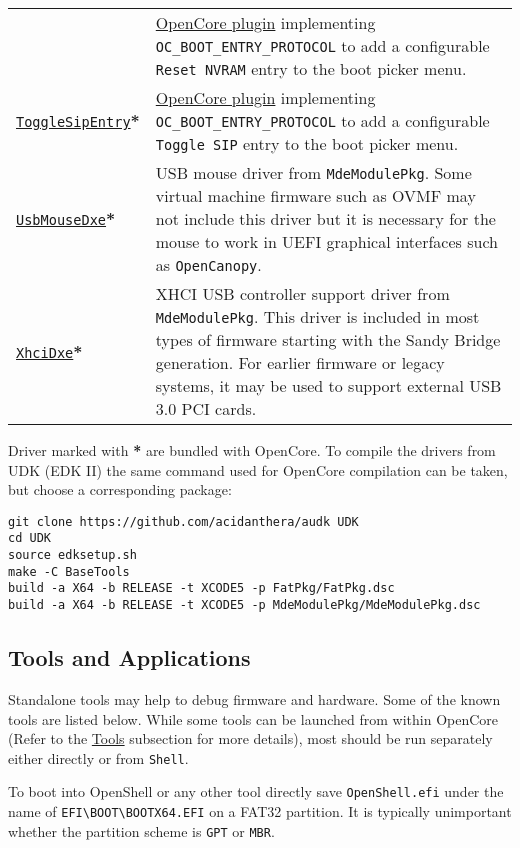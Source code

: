 \documentclass[]{article}
\makeatletter
\renewcommand{\label}[1]{%
\zref@wrapper@immediate{\oldlabel{#1}}}  %
\makeatother
\begin{document}
\begin{longtable}{p{1.65in}p{5.25in}}
& \hyperref[uefiresetnvram]{OpenCore plugin} implementing \texttt{OC\_BOOT\_ENTRY\_PROTOCOL}
  to add a configurable \texttt{Reset NVRAM} entry to the boot picker menu. \\
\href{https://github.com/acidanthera/OpenCorePkg}{\texttt{ToggleSipEntry}}\textbf{*}
& \hyperref[uefitogglesip]{OpenCore plugin} implementing \texttt{OC\_BOOT\_ENTRY\_PROTOCOL}
  to add a configurable \texttt{Toggle SIP} entry to the boot picker menu. \\
\href{https://github.com/acidanthera/audk}{\texttt{UsbMouseDxe}}\textbf{*}
& USB mouse driver from \texttt{MdeModulePkg}. Some virtual machine firmware
  such as OVMF may not include this driver but it is necessary for the mouse to work
  in UEFI graphical interfaces such as \texttt{OpenCanopy}. \\
\href{https://github.com/acidanthera/audk}{\texttt{XhciDxe}}\textbf{*}
& XHCI USB controller support driver from \texttt{MdeModulePkg}. This driver is
  included in most types of firmware starting with the Sandy Bridge generation. For earlier firmware
  or legacy systems, it may be used to support external USB 3.0 PCI cards.
\end{longtable}

Driver marked with \textbf{*} are bundled with OpenCore.
To compile the drivers from UDK (EDK II) the same command used for
OpenCore compilation can be taken, but choose a corresponding package:
\begin{lstlisting}[label=compileudk, style=ocbash]
git clone https://github.com/acidanthera/audk UDK
cd UDK
source edksetup.sh
make -C BaseTools
build -a X64 -b RELEASE -t XCODE5 -p FatPkg/FatPkg.dsc
build -a X64 -b RELEASE -t XCODE5 -p MdeModulePkg/MdeModulePkg.dsc
\end{lstlisting}

\subsection{Tools and Applications}\label{uefitools}

Standalone tools may help to debug firmware and hardware. Some of the known tools are listed below.
While some tools can be launched from within OpenCore (Refer to the \hyperref[misctools]{Tools} subsection
for more details), most should be run separately either directly or from \texttt{Shell}.

To boot into OpenShell or any other tool directly save \texttt{OpenShell.efi}
under the name of \texttt{EFI\textbackslash BOOT\textbackslash BOOTX64.EFI}
on a FAT32 partition. It is typically unimportant whether the partition scheme
is \texttt{GPT} or \texttt{MBR}.
\end{document}
